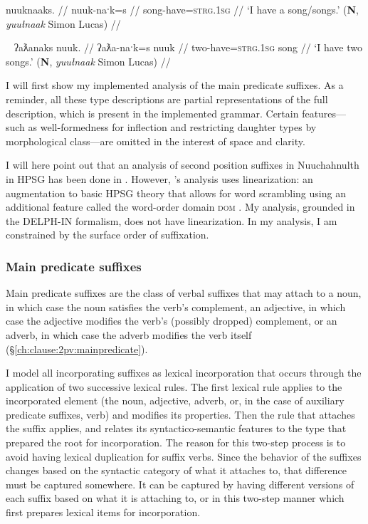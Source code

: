 \ex \label{ex:havesong2}
\begingl
\glpreamble nuuknaaks. //
\gla nuuk-naˑk=s //
\glb song-have=\textsc{strg.1sg} //
\glft `I have a song/songs.' (\textbf{N}, \textit{yuułnaak} Simon Lucas) //
\endgl
\xe

\ex~ \label{ex:havetwosongs2}
\begingl
\glpreamble ʔaƛanaks nuuk. //
\gla ʔaƛa-naˑk=s nuuk //
\glb two-have=\textsc{strg.1sg} song //
\glft `I have two songs.' (\textbf{N}, \textit{yuułnaak} Simon Lucas) //
\endgl
\xe


I will first show my implemented analysis of the main predicate suffixes. As a reminder, all these type descriptions are partial representations of the full description, which is present in the implemented grammar. Certain features---such as well-formedness for inflection and restricting daughter types by morphological class---are omitted in the interest of space and clarity.

I will here point out that an analysis of second position suffixes in Nuuchahnulth in HPSG has been done in \cite{waldie2004}. However, \citeauthor{waldie2004}'s analysis uses linearization: an augmentation to basic HPSG theory that allows for word scrambling using an additional feature called the word-order domain \textsc{dom} \citep{reape1993}. My analysis, grounded in the DELPH-IN formalism, does not have linearization. In my analysis, I am constrained by the surface order of suffixation.

\subsubsection{Main predicate suffixes}

Main predicate suffixes are the class of verbal suffixes that may attach to a noun, in which case the noun satisfies the verb's complement, an adjective, in which case the adjective modifies the verb's (possibly dropped) complement, or an adverb, in which case the adverb modifies the verb itself (\S\ref{ch:clause:2pv:mainpredicate}).

I model all incorporating suffixes as lexical incorporation that occurs through the application of two successive lexical rules. The first lexical rule applies to the incorporated element (the noun, adjective, adverb, or, in the case of auxiliary predicate suffixes, verb) and modifies its properties. Then the rule that attaches the suffix applies, and relates its syntactico-semantic features to the type that prepared the root for incorporation. The reason for this two-step process is to avoid having lexical duplication for suffix verbs. Since the behavior of the suffixes changes based on the syntactic category of what it attaches to, that difference must be captured somewhere. It can be captured by having different versions of each suffix based on what it is attaching to, or in this two-step manner which first prepares lexical items for incorporation.

